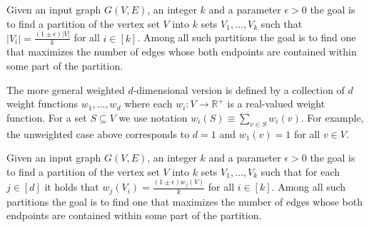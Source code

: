 \begin{definition}
	Given an input graph $G(V, E)$, an integer $k$ and a parameter $\epsilon > 0$ the goal is to find a partition of the vertex set $V$ into $k$ sets $V_1, \dots, V_k$ such that $|V_i| = \frac{(1\pm \epsilon) |V|}{k}$ for all $i \in [k]$. Among all such partitions the goal is to find one that maximizes the number of edges whose both endpoints are contained within some part of the partition. 
\end{definition}

The more general weighted $d$-dimensional version is defined by a collection of $d$ weight functions $w_1, \dots, w_d$ where each $w_i \colon V \to \mathbb R^+$ is a real-valued weight function. For a set $S \subseteq V$ we use notation $w_i(S) \equiv \sum_{v \in S} w_i(v)$. For example, the unweighted case above corresponds to $d = 1$ and $w_1(v) = 1$ for all $v \in V$.

\begin{definition}
	Given an input graph $G(V, E)$, an integer $k$ and a parameter $\epsilon > 0$ the goal is to find a partition of the vertex set $V$ into $k$ sets $V_1, \dots, V_k$ such that for each $j \in [d]$ it holds that  $w_j(V_i) = \frac{(1\pm \epsilon) w_j(V)}{k}$ for all $i \in [k]$. Among all such partitions the goal is to find one that maximizes the number of edges whose both endpoints are contained within some part of the partition. 
\end{definition}

